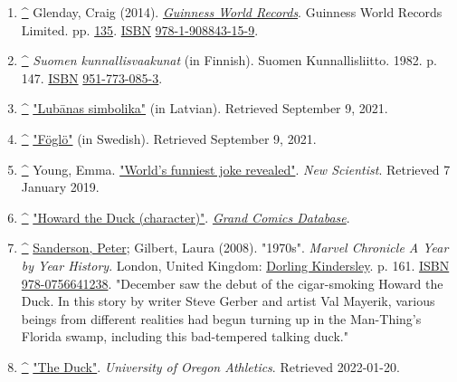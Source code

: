 \documentclass[11pt,a4paper]{article}
\begin{document}
\begin{enumerate}
\item \href{\#cite\_ref-48}{\textbf{\textasciicircum{}}} Glenday, Craig (2014). \href{https://archive.org/details/guinnessworldrec0000unse\_r3e7/page/135}{\textit{Guinness World Records}}. Guinness World Records Limited. pp. \href{https://archive.org/details/guinnessworldrec0000unse\_r3e7/page/135}{135}. \href{/wiki/ISBN\_\%28identifier\%29}{ISBN} \href{/wiki/Special:BookSources/978-1-908843-15-9}{978-1-908843-15-9}.
\item \href{\#cite\_ref-49}{\textbf{\textasciicircum{}}} \textit{Suomen kunnallisvaakunat} (in Finnish). Suomen Kunnallisliitto. 1982. p. 147. \href{/wiki/ISBN\_\%28identifier\%29}{ISBN} \href{/wiki/Special:BookSources/951-773-085-3}{951-773-085-3}.
\item \href{\#cite\_ref-50}{\textbf{\textasciicircum{}}} \href{http://www.lubana.lv/index.php/lv/homepage/lubanas-pilseta-2}{"Lubānas simbolika"} (in Latvian). Retrieved September 9, 2021.
\item \href{\#cite\_ref-51}{\textbf{\textasciicircum{}}} \href{http://digi.narc.fi/digi/view.ka?kuid=1738595}{"Föglö"} (in Swedish). Retrieved September 9, 2021.
\item \href{\#cite\_ref-52}{\textbf{\textasciicircum{}}} Young, Emma. \href{https://www.newscientist.com/article/dn2876-worlds-funniest-joke-revealed/}{"World's funniest joke revealed"}. \textit{New Scientist}. Retrieved 7 January 2019.
\item \href{\#cite\_ref-53}{\textbf{\textasciicircum{}}} \href{http://www.comics.org/character/name/Howard\%20the\%20Duck/sort/chrono/}{"Howard the Duck (character)"}. \href{/wiki/Grand\_Comics\_Database}{\textit{Grand Comics Database}}.
\item \href{\#cite\_ref-54}{\textbf{\textasciicircum{}}} \href{/wiki/Peter\_Sanderson}{Sanderson, Peter}; Gilbert, Laura (2008). "1970s". \textit{Marvel Chronicle A Year by Year History}. London, United Kingdom: \href{/wiki/Dorling\_Kindersley}{Dorling Kindersley}. p. 161. \href{/wiki/ISBN\_\%28identifier\%29}{ISBN} \href{/wiki/Special:BookSources/978-0756641238}{978-0756641238}. "December saw the debut of the cigar-smoking Howard the Duck. In this story by writer Steve Gerber and artist Val Mayerik, various beings from different realities had begun turning up in the Man-Thing's Florida swamp, including this bad-tempered talking duck."
\item \href{\#cite\_ref-55}{\textbf{\textasciicircum{}}} \href{https://goducks.com/sports/2003/8/28/153778.aspx}{"The Duck"}. \textit{University of Oregon Athletics}. Retrieved 2022-01-20.
\end{enumerate}
\end{document}
